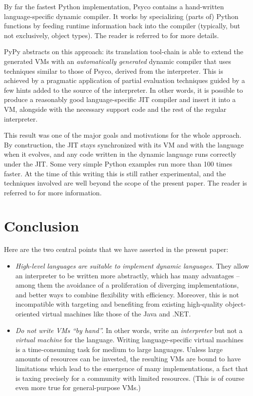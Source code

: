 \documentclass{llncs}
\begin{document}
By far the fastest Python implementation, Psyco \cite{psyco-software}
contains a hand-written language-specific dynamic compiler.  It works by
specializing (parts of) Python functions by feeding runtime information
back into the compiler (typically, but not exclusively, object types).
The reader is referred to \cite{Psyco-paper} for more details.

PyPy abstracts on this approach: its translation tool-chain is able to
extend the generated VMs with an \emph{automatically generated} dynamic
compiler that uses techniques similar to those of Psyco, derived from
the interpreter.  This is achieved by a pragmatic application of partial
evaluation techniques guided by a few hints added to the source of the
interpreter.  In other words, it is possible to produce a reasonably
good language-specific JIT compiler and insert it into a VM, alongside
with the necessary support code and the rest of the regular interpreter.

This result was one of the major goals and motivations for the whole
approach.  By construction, the JIT stays synchronized with its VM
and with the language when it evolves,
and any code written in the dynamic language runs
correctly under the JIT.  Some very simple Python examples run more than
100 times faster.  At the time of this writing this is still rather
experimental, and the techniques involved are well beyond the scope of
the present paper.  The reader is referred to \cite{D08.2} for more
information.


\section{Conclusion}
\label{sect:conclusion}

Here are the two central points that we have asserted in the present
paper:

\begin{itemize}
\item \emph{High-level languages are suitable to implement dynamic languages.}
They allow an interpreter to be written more abstractly, which has many
advantages -- among them the avoidance of a proliferation of diverging
implementations, and better ways to combine flexibility with efficiency.
Moreover, this is not incompatible with targeting and benefiting from
existing high-quality object-oriented virtual machines like those of the
Java and .NET.

\item \emph{Do not write VMs ``by hand''.}
In other words, write an \emph{interpreter} but not a
\emph{virtual machine} for the language.
Writing language-specific virtual machines is a time-consuming task for
medium to large languages.  Unless large amounts of resources can be
invested, the resulting VMs are bound to have limitations which lead to
the emergence of many implementations, a fact that is taxing precisely
for a community with limited resources.  (This is of course even more
true for general-purpose VMs.)
\end{itemize}
\end{document}
